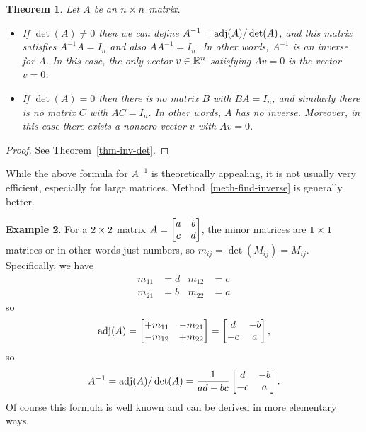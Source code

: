 \documentclass[reqno]{amsart}
\newtheorem{theorem}{Theorem}[section]
\theoremstyle{definition}
\newtheorem{example}[theorem]{Example}
\begin{document}
\begin{theorem}\label{thm-inv-det-pre}
 Let $A$ be an $n\times n$ matrix.  
 \begin{itemize}
  \item[(a)] If $\det(A)\neq 0$ then we can define
   $A^{-1}=\operatorname{adj}(A)/\det(A)$, and this matrix satisfies $A^{-1}A=I_n$
   and also $AA^{-1}=I_n$.  In other words, $A^{-1}$ is an inverse for
   $A$.  In this case, the only vector $v\in{\mathbb{R}}^n$ satisfying $Av=0$ is
   the vector $v=0$.
  \item[(b)] If $\det(A)=0$ then there is no matrix $B$ with $BA=I_n$,
   and similarly there is no matrix $C$ with $AC=I_n$.  In other
   words, $A$ has no inverse.  Moreover, in this case there exists a
   nonzero vector $v$ with $Av=0$.
 \end{itemize}
\end{theorem}
\begin{proof}
 See Theorem~\ref{thm-inv-det}.
\end{proof}

While the above formula for $A^{-1}$ is theoretically appealing,
it is not usually very efficient, especially for large matrices.
Method~\ref{meth-find-inverse} is generally better.

\begin{example}\label{eg-adjugate-two}
 For a $2\times 2$ matrix $A=\left[\begin{matrix} a&b\\ c&d\end{matrix}\right]$, the minor matrices are
 $1\times 1$ matrices or in other words just numbers, so
 $m_{ij}=\det(M_{ij})=M_{ij}$.  Specifically, we have
 \begin{align*}
  m_{11} &= d & m_{12} &= c \\
  m_{21} &= b & m_{22} &= a
 \end{align*}
 so 
 \[ \operatorname{adj}(A) = \left[\begin{matrix} +m_{11} & -m_{21} \\ -m_{12} & +m_{22}\end{matrix}\right]
     = \left[\begin{matrix} d & -b \\ -c & a \end{matrix}\right],
 \]
 so 
 \[ A^{-1} = 
     \operatorname{adj}(A)/\det(A) = 
      \frac{1}{ad-bc} \left[\begin{matrix} d & -b \\ -c & a \end{matrix}\right].
 \]
 Of course this formula is well known and can be derived in more
 elementary ways.
\end{example}
\end{document}
